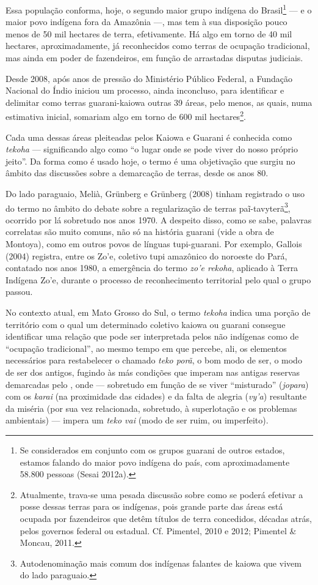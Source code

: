 Essa população conforma, hoje, o segundo maior grupo indígena do
Brasil\footnote{Se considerados em conjunto com os grupos guarani de
outros estados, estamos falando do maior povo indígena do país, com
aproximadamente 58.800 pessoas (Sesai 2012a).} --- e o maior povo
indígena fora da Amazônia ---, mas tem à sua disposição pouco menos de 50
mil hectares de terra, efetivamente. Há algo em torno de 40 mil
hectares, aproximadamente, já reconhecidos como terras de ocupação
tradicional, mas ainda em poder de fazendeiros, em função de arrastadas
disputas judiciais. 

Desde 2008, após anos de pressão do Ministério Público Federal, a
Fundação Nacional do Índio iniciou um processo, ainda inconcluso, para
identificar e delimitar como terras guarani-kaiowa outras 39 áreas,
pelo menos, as quais, numa estimativa inicial, somariam algo em torno
de 600 mil hectares\footnote{Atualmente, trava-se uma pesada discussão
sobre como se poderá efetivar a posse dessas terras para os indígenas,
pois grande parte das áreas está ocupada por fazendeiros que detêm
títulos de terra concedidos, décadas atrás, pelos governos federal ou
estadual. Cf. Pimentel, 2010 e 2012; Pimentel \& Moncau, 2011.}. 

Cada uma dessas áreas pleiteadas pelos Kaiowa e Guarani é conhecida como
\emph{tekoha} --- significando algo como ``o lugar onde se pode viver do nosso
próprio jeito''. Da forma como é usado hoje, o termo é uma objetivação
que surgiu no âmbito das discussões sobre a demarcação de terras, desde
os anos 80. 

Do lado paraguaio, Melià, Grünberg e Grünberg (2008) tinham registrado o
uso do termo no âmbito do debate sobre a regularização de terras
paĩ{}-tavyterã\footnote{Autodenominação mais comum dos indígenas
falantes de kaiowa que vivem do lado paraguaio.}, ocorrido por lá
sobretudo nos anos 1970. A despeito disso, como se sabe, palavras
correlatas são muito comuns, não só na história guarani (vide a obra de
Montoya), como em outros povos de línguas tupi-guarani. Por exemplo,
Gallois (2004) registra, entre os Zo’e, coletivo tupi amazônico do
noroeste do Pará, contatado nos anos 1980, a emergência do termo \emph{zo’e
rekoha}, aplicado à Terra Indígena Zo’e, durante o processo de
reconhecimento territorial pelo qual o grupo passou. 

No contexto atual, em Mato Grosso do Sul, o termo \emph{tekoha} indica uma
porção de território com o qual um determinado coletivo kaiowa ou
guarani consegue identificar uma relação que pode ser interpretada
pelos não indígenas como de ``ocupação tradicional'', ao mesmo tempo em
que percebe, ali, os elementos necessários para restabelecer o chamado
\emph{teko porã}, o bom modo de ser, o modo de ser dos antigos, fugindo às más
condições que imperam nas antigas reservas demarcadas pelo , onde ---
sobretudo em função de se viver ``misturado'' (\emph{jopara}) com os \emph{karai} (na
proximidade das cidades) e da falta de alegria (\emph{vy’a}) resultante da
miséria (por sua vez relacionada, sobretudo, à superlotação e os
problemas ambientais) --- impera um \emph{teko vai} (modo de ser ruim, ou
imperfeito).

